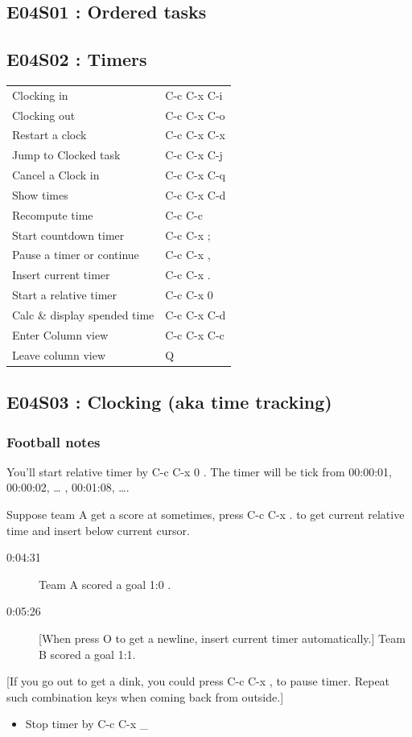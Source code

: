 \documentclass[11pt]{article}
\begin{document}
\subsection{E04S01 : Ordered tasks}
\label{sec:orgb81b80c}
\subsection{E04S02 : Timers}
\label{sec:orgf41d533}
\begin{center}
\begin{tabular}{ll}
\hline
Clocking in &  C-c C-x C-i \\
Clocking out &  C-c C-x C-o \\
Restart a clock &  C-c C-x C-x \\
Jump to Clocked task &  C-c C-x C-j \\
Cancel a Clock in &  C-c C-x C-q \\
Show times &  C-c C-x C-d \\
Recompute time &  C-c C-c \\
Start countdown timer &  C-c C-x ; \\
Pause a timer or continue &  C-c C-x , \\
Insert current timer &  C-c C-x . \\
Start a relative timer &  C-c C-x 0 \\
Calc \& display spended time &  C-c C-x C-d \\
Enter Column view &  C-c C-x C-c \\
Leave column view &  Q \\
\hline
\end{tabular}
\end{center}

\subsection{E04S03 : Clocking (aka time tracking)}
\label{sec:org0d7ce04}
\subsubsection{Football notes}
\label{sec:orgca6de1b}

You'll start relative timer by  C-c C-x 0 
. The timer will be tick from 00:00:01, 00:00:02, \ldots{} , 00:01:08, \ldots{}.

Suppose team A get a score at sometimes, press  C-c C-x .
 to get current relative time and insert below current
cursor.

\begin{description}
\item[{0:04:31}] Team A scored a goal 1:0 .
\item[{0:05:26}] [When press  O  to get a
newline, insert current timer automatically.] Team B scored
a goal 1:1.
\end{description}
[If you go out to get a dink, you could press  C-c C-x ,  
 to pause timer. Repeat such combination keys when coming back from outside.]
\begin{itemize}
\item Stop timer by  C-c C-x \_
\end{itemize}
\end{document}
